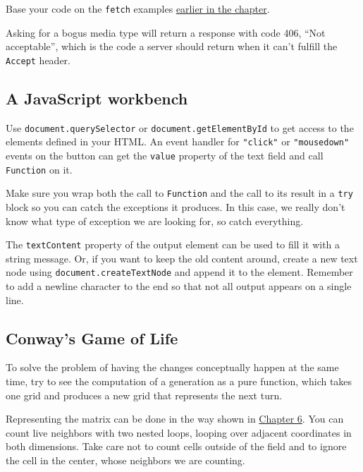 Base your code on the \lstinline`fetch` examples \hyperref[http.fetch]{earlier in the chapter}.

Asking for a bogus media type will return a response with code 406, ``Not acceptable'', which is the code a server should return when it can't fulfill the \lstinline`Accept` header.

\subsection{A JavaScript workbench}

Use \lstinline`document.querySelector` or \lstinline`document.getElementById` to get access to the elements defined in your HTML. An event handler for \lstinline`"click"` or \lstinline`"mousedown"` events on the button can get the \lstinline`value` property of the text field and call \lstinline`Function` on it.

Make sure you wrap both the call to \lstinline`Function` and the call to its result in a \lstinline`try` block so you can catch the exceptions it produces. In this case, we really don't know what type of exception we are looking for, so catch everything.

The \lstinline`textContent` property of the output element can be used to fill it with a string message. Or, if you want to keep the old content around, create a new text node using \lstinline`document.createTextNode` and append it to the element. Remember to add a newline character to the end so that not all output appears on a single line.

\subsection{Conway's Game of Life}

To solve the problem of having the changes conceptually happen at the same time, try to see the computation of a generation as a pure
function, which takes one grid and produces a new grid that represents the next turn.

Representing the matrix can be done in the way shown in \hyperref[object.matrix]{Chapter 6}. You can count live neighbors with two nested loops, looping over adjacent coordinates in both dimensions. Take care not to count cells outside of the field and to ignore the cell in the center, whose neighbors we are counting.

